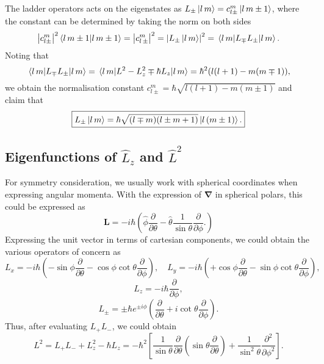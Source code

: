 \documentclass{article}
\theoremstyle{nonumberplain}
\begin{document}
The ladder operators acts on the eigenstates as $L_{\pm} \ket{l \, m} = c_{l \pm}^m \ket{l \, m \pm 1} $, where the constant can be determined by taking the norm on both sides 
\[
    \left\vert c_{l \pm}^m \right\vert ^2 \braket{l\, m \pm 1} 
    = \left\vert c_{l\, \pm}^m \right\vert ^2
    = \left\vert {L_{\pm}} \ket{l\, m} \right\vert^2
    = \ev{L_{\mp} L_{\pm}}{l\, m}.
\]
Noting that
\[
    \ev{L_{\mp} L_{\pm}}{l\, m} = \ev{L^2 - L_z^2 \mp \hbar  L_z}{l\,m}
    = \hbar^2 (l(l+1) - m(m \mp 1)),
\]
we obtain the normalisation constant $c_{l \pm}^m = \hbar \sqrt{l(l+1) - m(m \pm 1)}$ and claim that 
\[
    \boxed{
        L_{\pm} \ket{l \, m}
        = \hbar \sqrt{(l \mp m) (l \pm m + 1)} \ket{l \, (m\pm 1)}. 
    }
\]
\subsection{Eigenfunctions of $\hat{L} _z$ and $\hat{L} ^2$} \label{sec:eigenfunction}
For symmetry consideration, we usually work with spherical coordinates when expressing angular momenta. With the expression of $\mathbf{\nabla}$ in spherical polars, this could be expressed as 
\[
    \mathbf{L}  = 
    -i \hbar  \left( 
        \hat{\phi} \frac{\partial }{\partial \theta } - \hat{\theta} \frac{1}{\sin \theta } \frac{\partial }{\partial \phi} .
    \right)
\]
Expressing the unit vector in terms of cartesian components, we could obtain the various operators of concern as 
\[
    L_x = - i \hbar \left( 
        -\sin \phi \frac{\partial }{\partial \theta } - \cos \phi  \cot \theta \frac{\partial }{\partial \phi } 
    \right), \quad 
    L_y = -i \hbar \left( 
        + \cos{\phi} \frac{\partial }{\partial \theta } - \sin \phi  \cot \theta \frac{\partial }{\partial \phi } 
    \right),
\]
\[
    \boxed{
        L_z = -i \hbar \frac{\partial }{\partial \phi } ,
    }
\]
\[
    L_{\pm} = \pm \hbar  e^{\pm i \phi } \left( 
        \frac{\partial }{\partial \theta } + i \cot \theta \frac{\partial }{\partial \phi }
    \right). 
\]
Thus, after evaluating $L_+ L_-$, we could obtain 
\[
    \boxed{
        L^2 = L_+ L_- + L_z^2 - \hbar L_z 
        = -\hbar^2 \left[ 
            \frac{1}{\sin \theta } \frac{\partial }{\partial \theta } \left( 
                \sin \theta \frac{\partial }{\partial \theta } 
            \right) + \frac{1}{\sin ^2 \theta } \frac{\partial ^2 }{\partial \phi ^2 } 
        \right].
    }
\]
\end{document}
